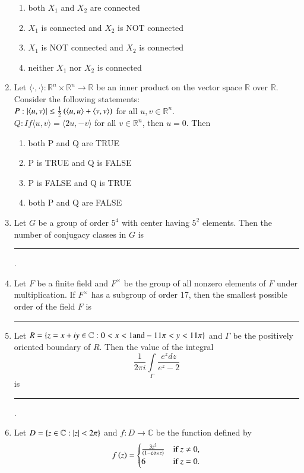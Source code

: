 \documentclass[journal,12pt,onecolumn]{IEEEtran}
\theoremstyle{remark}
\begin{document}
\begin{enumerate}
\begin{enumerate}
\item both $X_1$ and $X_2$ are connected
\item $X_1$ is connected and $X_2$ is NOT connected
\item $X_1$ is NOT connected and $X_2$ is connected
\item neither $X_1$ nor $X_2$ is connected
\end{enumerate}
\item Let $\langle \cdot,\cdot\rangle: \mathbb{R}^n \times \mathbb{R}^n\rightarrow\mathbb{R}$ be an inner product on the vector space $\mathbb{R}$ over $\mathbb{R}$. Consider the following statements:\\
$P: \left\vert\langle u, v\rangle\right\vert \leq \frac{1}{2}\left(\langle u, u\rangle + \langle v, v\rangle\right)$ for all $u, v \in \mathbb{R}^n$.\\
$Q: If \langle u, v\rangle = \langle 2u, - v\rangle$ for all $v\in\mathbb{R}^n$, then $u = 0$. Then
\begin{enumerate}
\item both P and Q are TRUE
\item P is TRUE and Q is FALSE
\item P is FALSE and Q is TRUE
\item both P and Q are FALSE
\end{enumerate}
\item Let $G$ be a group of order $5^4$ with center having $5^2$ elements. Then the number of conjugacy classes in $G$ is \rule{2cm}{0.15mm}.
\item Let $F$ be a finite field and $F^\times$ be the group of all nonzero elements of $F$ under multiplication. If $F^\times$ has a subgroup of order 17, then the smallest possible order of the field $F$ is \rule{2cm}{0.15mm}
\item Let $R= \left\{z = x + iy \in \mathbb{C} : 0 < x < 1 \text{and} - 11\pi < y < 11\pi \right\}$ and $\Gamma$ be the positively oriented boundary of $R$. Then the value of the integral
\[
\frac{1}{2\pi i}\int\limits_\Gamma\frac{e^z dz}{e^z -2}
\]
is \rule{2cm}{0.15mm}.
\item Let $D = \left\{z \in \mathbb{C} : \left\vert z\right\vert<2\pi\right\}$ and $f:D\rightarrow \mathbb{C}$ be the function defined by\\
$$f\left(z\right) = \begin{cases}
\frac{3z^2}{\left(1-\cos z\right)} & \text{if } z \neq 0, \\
6 & \text{if } z = 0.
\end{cases}$$

\end{enumerate}
\end{document}
